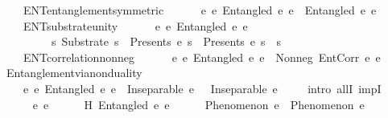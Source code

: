 \begin{isabellebody}
\ \ \ \ ENT{}{\isacharunderscore}{\kern0pt}entanglement{\isacharunderscore}{\kern0pt}symmetric{\isacharcolon}{\kern0pt}\isanewline
\ \ \ \ \ \ {\isachardoublequoteopen}{\isasymforall}e{}\ e{}{\isachardot}{\kern0pt}\ Entangled\ e{}\ e{}\ {\isasymlongleftrightarrow}\ Entangled\ e{}\ e{}{\isachardoublequoteclose}\ \isanewline
\ \ \ \ ENT{}{\isacharunderscore}{\kern0pt}substrate{\isacharunderscore}{\kern0pt}unity{\isacharcolon}{\kern0pt}\isanewline
\ \ \ \ \ \ {\isachardoublequoteopen}{\isasymforall}e{}\ e{}{\isachardot}{\kern0pt}\ Entangled\ e{}\ e{}\ {\isasymlongrightarrow}\isanewline
\ \ \ \ \ \ \ \ \ {\isacharparenleft}{\kern0pt}{\isasymexists}s{\isachardot}{\kern0pt}\ Substrate\ s\ {\isasymand}\ Presents\ e{}\ s\ {\isasymand}\ Presents\ e{}\ s\ {\isasymand}\ s\ {\isacharequal}{\kern0pt}\ {\isasymOmega}{\isacharparenright}{\kern0pt}{\isachardoublequoteclose}\ \isanewline
\ \ \ \ ENT{}{\isacharunderscore}{\kern0pt}correlation{\isacharunderscore}{\kern0pt}nonneg{\isacharcolon}{\kern0pt}\isanewline
\ \ \ \ \ \ {\isachardoublequoteopen}{\isasymforall}e{}\ e{}{\isachardot}{\kern0pt}\ Entangled\ e{}\ e{}\ {\isasymlongrightarrow}\ Nonneg\ {\isacharparenleft}{\kern0pt}EntCorr\ e{}\ e{}{\isacharparenright}{\kern0pt}{\isachardoublequoteclose}\isanewline
\isanewline
\ \ \isamarkupfalse%
\ Entanglement{\isacharunderscore}{\kern0pt}via{\isacharunderscore}{\kern0pt}nonduality{\isacharcolon}{\kern0pt}\isanewline
\ \ \ \ {\isachardoublequoteopen}{\isasymforall}e{}\ e{}{\isachardot}{\kern0pt}\ Entangled\ e{}\ e{}\ {\isasymlongrightarrow}\ Inseparable\ e{}\ {\isasymOmega}\ {\isasymand}\ Inseparable\ e{}\ {\isasymOmega}{\isachardoublequoteclose}\isanewline
%
\isadelimproof
\ \ %
\endisadelimproof
%
\isatagproof
{}\isamarkupfalse%
\ {\isacharparenleft}{\kern0pt}intro\ allI\ impI{\isacharparenright}{\kern0pt}\isanewline
\ \ \ \ \isamarkupfalse%
\ e{}\ e{}\isanewline
\ \ \ \ \isamarkupfalse%
\ H{\isacharcolon}{\kern0pt}\ {\isachardoublequoteopen}Entangled\ e{}\ e{}{\isachardoublequoteclose}\isanewline
\ \ \ \ \isamarkupfalse%
\ {\isachardoublequoteopen}Phenomenon\ e{}\ {\isasymand}\ Phenomenon\ e{}{\isachardoublequoteclose}\ \isamarkupfalse%

\end{isabellebody}
